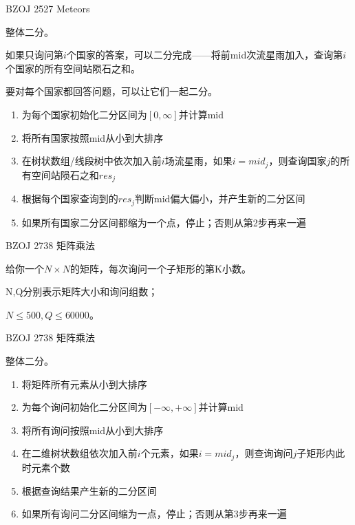 \documentclass{beamer}
\begin{document}
\begin{frame}{BZOJ 2527 Meteors}
    
    整体二分。

    如果只询问第$i$个国家的答案，可以二分完成——将前mid次流星雨加入，查询第$i$个国家的所有空间站陨石之和。

    要对每个国家都回答问题，可以让它们一起二分。

    \begin{enumerate}
        \item 为每个国家初始化二分区间为$[0,\infty]$并计算mid
        \item 将所有国家按照mid从小到大排序
        \item 在树状数组/线段树中依次加入前$i$场流星雨，如果$i=mid_j$，则查询国家$j$的所有空间站陨石之和$res_j$
        \item 根据每个国家查询到的$res_j$判断mid偏大偏小，并产生新的二分区间
        \item 如果所有国家二分区间都缩为一个点，停止；否则从第2步再来一遍
    \end{enumerate}

\end{frame}

\begin{frame}{BZOJ 2738 矩阵乘法}

    给你一个$N\times N$的矩阵，每次询问一个子矩形的第K小数。
    
    N,Q分别表示矩阵大小和询问组数；
    
    $N\leq 500,Q\leq 60000。$
    
\end{frame}

\begin{frame}{BZOJ 2738 矩阵乘法}
    
    整体二分。
    
    \begin{enumerate}
        \item 将矩阵所有元素从小到大排序
        \item 为每个询问初始化二分区间为$[-\infty,+\infty]$并计算mid
        \item 将所有询问按照mid从小到大排序
        \item 在二维树状数组依次加入前$i$个元素，如果$i=mid_j$，则查询询问$j$子矩形内此时元素个数
        \item 根据查询结果产生新的二分区间
        \item 如果所有询问二分区间缩为一点，停止；否则从第3步再来一遍
    \end{enumerate}
    
\end{frame}
\end{document}
